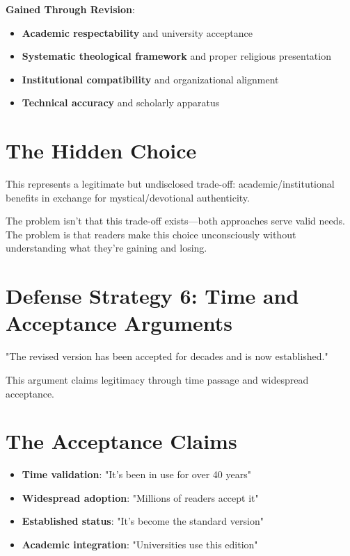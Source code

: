 \documentclass[11pt,twoside]{book}
\begin{document}
\textbf{\textbf{Gained Through Revision}}:
\begin{itemize}
\item \textbf{\textbf{Academic respectability}} and university acceptance
\item \textbf{\textbf{Systematic theological framework}} and proper religious presentation
\item \textbf{\textbf{Institutional compatibility}} and organizational alignment
\item \textbf{\textbf{Technical accuracy}} and scholarly apparatus
\end{itemize}
\section*{The Hidden Choice}
\label{sec:org5e76b5c}
This represents a legitimate but undisclosed trade-off: academic/institutional benefits in exchange for mystical/devotional authenticity.

The problem isn't that this trade-off exists—both approaches serve valid needs. The problem is that readers make this choice unconsciously without understanding what they're gaining and losing.
\section*{Defense Strategy 6: Time and Acceptance Arguments}
\label{sec:orgdbdfcd6}

"The revised version has been accepted for decades and is now established."

This argument claims legitimacy through time passage and widespread acceptance.
\section*{The Acceptance Claims}
\label{sec:org2969a2b}
\begin{itemize}
\item \textbf{\textbf{Time validation}}: "It's been in use for over 40 years"
\item \textbf{\textbf{Widespread adoption}}: "Millions of readers accept it"
\item \textbf{\textbf{Established status}}: "It's become the standard version"
\item \textbf{\textbf{Academic integration}}: "Universities use this edition"
\end{itemize}
\end{document}
